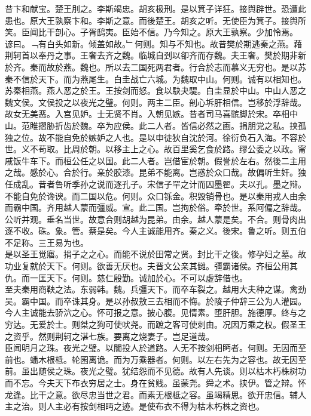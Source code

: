 \documentclass{zhvt-classic}
\begin{document}
\hspace*{2em}昔卞和献宝。楚王刖之。李斯竭忠。胡亥极刑。是以箕子详狂。接舆辟世。恐遭此患也。原大王孰察卞和。李斯之意。而後楚王。胡亥之听。无使臣为箕子。接舆所笑。臣闻比干剖心。子胥鸱夷。臣始不信。乃今知之。原大王孰察。少加怜焉。\\
\hspace*{2em}谚曰。﹁有白头如新。倾盖如故。﹂何则。知与不知也。故昔樊於期逃秦之燕。藉荆轲首以奉丹之事。王奢去齐之魏。临城自刭以卻齐而存魏。夫王奢。樊於期非新於齐。秦而故於燕。魏也。所以去二国死两君者。行合於志而慕义无穷也。是以苏秦不信於天下。而为燕尾生。白圭战亡六城。为魏取中山。何则。诚有以相知也。苏秦相燕。燕人恶之於王。王按剑而怒。食以駃夬騠。白圭显於中山。中山人恶之魏文侯。文侯投之以夜光之璧。何则。两主二臣。剖心坼肝相信。岂移於浮辞哉。\\
\hspace*{2em}故女无美恶。入宫见妒。士无贤不肖。入朝见嫉。昔者司马喜髌脚於宋。卒相中山。范睢摺胁折齿於魏。卒为应侯。此二人者。皆信必然之画。捐朋党之私。挟孤独之位。故不能自免於嫉妒之人也。是以申徒狄自沈於河。徐衍负石入海。不容於世。义不苟取。比周於朝。以移主上之心。故百里奚乞食於路。缪公委之以政。甯戚饭牛车下。而桓公任之以国。此二人者。岂借宦於朝。假誉於左右。然後二主用之哉。感於心。合於行。亲於胶漆。昆弟不能离。岂惑於众口哉。故偏听生奸。独任成乱。昔者鲁听季孙之说而逐孔子。宋信子罕之计而囚墨翟。夫以孔。墨之辩。不能自免於谗谀。而二国以危。何则。众口铄金。积毁销骨也。是以秦用戎人由余而霸中国。齐用越人蒙而彊威。宣。此二国。岂拘於俗。牵於世。系阿偏之辞哉。公听并观。垂名当世。故意合则胡越为昆弟。由余。越人蒙是矣。不合。则骨肉出逐不收。硃。象。管。蔡是矣。今人主诚能用齐。秦之义。後宋。鲁之听。则五伯不足称。三王易为也。\\
\hspace*{2em}是以圣王觉寤。捐子之之心。而能不说於田常之贤。封比干之後。修孕妇之墓。故功业复就於天下。何则。欲善无厌也。夫晋文公亲其雠。彊霸诸侯。齐桓公用其仇。而一匡天下。何则。慈仁殷勤。诚加於心。不可以虚辞借也。\\
\hspace*{2em}至夫秦用商鞅之法。东弱韩。魏。兵彊天下。而卒车裂之。越用大夫种之谋。禽劲吴。霸中国。而卒诛其身。是以孙叔敖三去相而不悔。於陵子仲辞三公为人灌园。今人主诚能去骄泬之心。怀可报之意。披心腹。见情素。堕肝胆。施德厚。终与之穷达。无爱於士。则桀之狗可使吠尧。而蹠之客可使刺由。况因万乘之权。假圣王之资乎。然则荆轲之湛七族。要离之烧妻子。岂足道哉。\\
\hspace*{2em}臣闻明月之珠。夜光之璧。以闇投人於道路。人无不按剑相眄者。何则。无因而至前也。蟠木根柢。轮囷离诡。而为万乘器者。何则。以左右先为之容也。故无因至前。虽出随侯之珠。夜光之璧。犹结怨而不见德。故有人先谈。则以枯木朽株树功而不忘。今夫天下布衣穷居之士。身在贫贱。虽蒙尧。舜之术。挟伊。管之辩。怀龙逢。比干之意。欲尽忠当世之君。而素无根柢之容。虽竭精思。欲开忠信。辅人主之治。则人主必有按剑相眄之迹。是使布衣不得为枯木朽株之资也。\\
\end{document}
